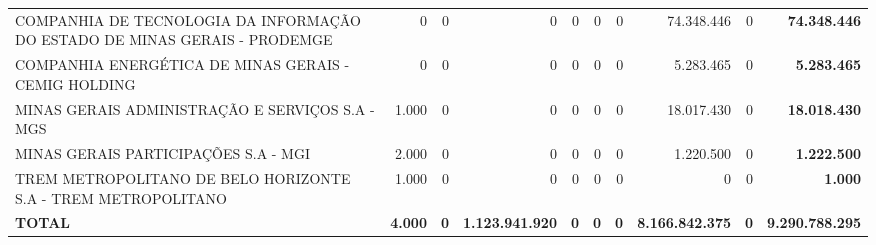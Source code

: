 \documentclass{article}
\begin{document}
\begin{landscape}
\begin{longtable}[c]{m{5.0cm}|m{1.75cm}|m{1.75cm}|m{1.75cm}|m{1.75cm}|m{1.75cm}|m{1.75cm}|m{1.75cm}|m{1.75cm}|m{1.0cm}}
\multicolumn{1}{L{5cm}|}{COMPANHIA DE TECNOLOGIA DA INFORMAÇÃO DO ESTADO DE MINAS GERAIS - PRODEMGE} & \multicolumn{1}{r|}{    0} & \multicolumn{1}{r|}{0} & \multicolumn{1}{r|}{            0} & \multicolumn{1}{r|}{0} & \multicolumn{1}{r|}{0} & \multicolumn{1}{r|}{0} & \multicolumn{1}{r|}{74.348.446} & \multicolumn{1}{r|}{0} & \multicolumn{1}{r}{ \textbf{74.348.446}} \\
\multicolumn{1}{L{5cm}|}{COMPANHIA ENERGÉTICA DE MINAS GERAIS - CEMIG HOLDING} & \multicolumn{1}{r|}{    0} & \multicolumn{1}{r|}{0} & \multicolumn{1}{r|}{            0} & \multicolumn{1}{r|}{0} & \multicolumn{1}{r|}{0} & \multicolumn{1}{r|}{0} & \multicolumn{1}{r|}{5.283.465} & \multicolumn{1}{r|}{0} & \multicolumn{1}{r}{ \textbf{5.283.465}} \\
\multicolumn{1}{L{5cm}|}{MINAS GERAIS ADMINISTRAÇÃO E SERVIÇOS S.A - MGS} & \multicolumn{1}{r|}{1.000} & \multicolumn{1}{r|}{0} & \multicolumn{1}{r|}{            0} & \multicolumn{1}{r|}{0} & \multicolumn{1}{r|}{0} & \multicolumn{1}{r|}{0} & \multicolumn{1}{r|}{18.017.430} & \multicolumn{1}{r|}{0} & \multicolumn{1}{r}{ \textbf{18.018.430}} \\
\multicolumn{1}{L{5cm}|}{MINAS GERAIS PARTICIPAÇÕES S.A - MGI} & \multicolumn{1}{r|}{2.000} & \multicolumn{1}{r|}{0} & \multicolumn{1}{r|}{            0} & \multicolumn{1}{r|}{0} & \multicolumn{1}{r|}{0} & \multicolumn{1}{r|}{0} & \multicolumn{1}{r|}{1.220.500} & \multicolumn{1}{r|}{0} & \multicolumn{1}{r}{ \textbf{1.222.500}} \\
\multicolumn{1}{L{5cm}|}{TREM METROPOLITANO DE BELO HORIZONTE S.A - TREM METROPOLITANO} & \multicolumn{1}{r|}{1.000} & \multicolumn{1}{r|}{0} & \multicolumn{1}{r|}{            0} & \multicolumn{1}{r|}{0} & \multicolumn{1}{r|}{0} & \multicolumn{1}{r|}{0} & \multicolumn{1}{r|}{            0} & \multicolumn{1}{r|}{0} & \multicolumn{1}{r}{ \textbf{1.000}} \\
\hline \hline
\multicolumn{1}{L{5cm}|}{ \textbf{TOTAL}} & \multicolumn{1}{r|}{ \textbf{4.000}} & \multicolumn{1}{r|}{ \textbf{0}} & \multicolumn{1}{r|}{ \textbf{1.123.941.920}} & \multicolumn{1}{r|}{ \textbf{0}} & \multicolumn{1}{r|}{ \textbf{0}} & \multicolumn{1}{r|}{ \textbf{0}} & \multicolumn{1}{r|}{ \textbf{8.166.842.375}} & \multicolumn{1}{r|}{ \textbf{0}} & \multicolumn{1}{r}{ \textbf{9.290.788.295}} \\\end{longtable}\end{landscape}
\end{document}
